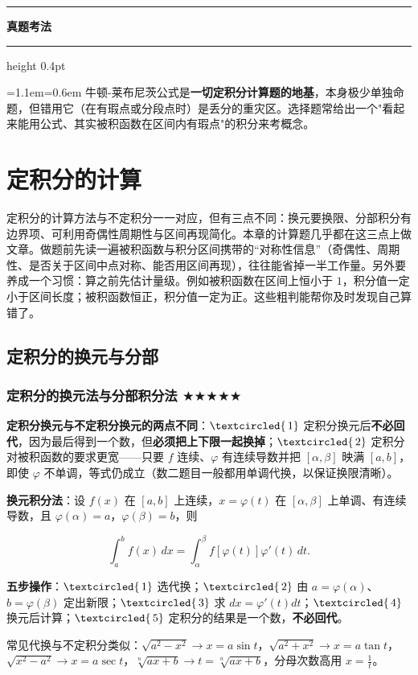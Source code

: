 \documentclass[11pt,openany,UTF8]{ctexbook}
\newcommand{\circled}[1]{\textcircled{\scriptsize\,#1}}
\newcommand{\callouthead}[2]{%
  \par\addvspace{7pt}\noindent
  {\color{#1}\rule[-0.15em]{3pt}{1.05em}}\hspace{0.5em}%
  {\bfseries\color{#1}#2}\par\nobreak\vspace{-0.35em}%
  {\color{rulesep}\hrule height 0.4pt}\nobreak\vspace{0.45em}%
  \begingroup\small\setlength{\parindent}{0pt}%
  \leftskip=1.1em\rightskip=0.6em\noindent\ignorespaces}
\newcommand{\calloutend}{\par\endgroup\addvspace{7pt}}
\newenvironment{callexam}[1]{\callouthead{exambar}{#1}}{\calloutend}
\begin{document}
\begin{callexam}{真题考法}
牛顿-莱布尼茨公式是\textbf{一切定积分计算题的地基}，本身极少单独命题，但错用它（在有瑕点或分段点时）是丢分的重灾区。选择题常给出一个"看起来能用公式、其实被积函数在区间内有瑕点"的积分来考概念。

\end{callexam}

\section{定积分的计算}

定积分的计算方法与不定积分一一对应，但有三点不同：换元要换限、分部积分有边界项、可利用奇偶性周期性与区间再现简化。本章的计算题几乎都在这三点上做文章。做题前先读一遍被积函数与积分区间携带的“对称性信息”（奇偶性、周期性、是否关于区间中点对称、能否用区间再现），往往能省掉一半工作量。另外要养成一个习惯：算之前先估计量级。例如被积函数在区间上恒小于 $1$，积分值一定小于区间长度；被积函数恒正，积分值一定为正。这些粗判能帮你及时发现自己算错了。

\subsection{定积分的换元与分部}

\subsubsection{定积分的换元法与分部积分法 $\bigstar$$\bigstar$$\bigstar$$\bigstar$$\bigstar$}

\textbf{定积分换元与不定积分换元的两点不同}：$\circled{1}$ 定积分换元后\textbf{不必回代}，因为最后得到一个数，但\textbf{必须把上下限一起换掉}；$\circled{2}$ 定积分对被积函数的要求更宽——只要 $f$ 连续、$\varphi$ 有连续导数并把 $[\alpha,\beta]$ 映满 $[a,b]$，即使 $\varphi$ 不单调，等式仍成立（数二题目一般都用单调代换，以保证换限清晰）。

\textbf{换元积分法}：设 $f(x)$ 在 $[a,b]$ 上连续，$x=\varphi(t)$ 在 $[\alpha,\beta]$ 上单调、有连续导数，且 $\varphi(\alpha)=a$，$\varphi(\beta)=b$，则

\[\int_a^bf(x)\,dx=\int_{\alpha}^{\beta}f\!\left[\varphi(t)\right]\varphi'(t)\,dt.\]

\textbf{五步操作}：$\circled{1}$ 选代换；$\circled{2}$ 由 $a=\varphi(\alpha)$、$b=\varphi(\beta)$ 定出新限；$\circled{3}$ 求 $dx=\varphi'(t)dt$；$\circled{4}$ 换元后计算；$\circled{5}$ 定积分的结果是一个数，\textbf{不必回代}。

常见代换与不定积分类似：$\sqrt{a^2-x^2}\to x=a\sin t$，$\sqrt{a^2+x^2}\to x=a\tan t$，$\sqrt{x^2-a^2}\to x=a\sec t$，$\sqrt[n]{ax+b}\to t=\sqrt[n]{ax+b}$，分母次数高用 $x=\frac{1}{t}$。
\end{document}
